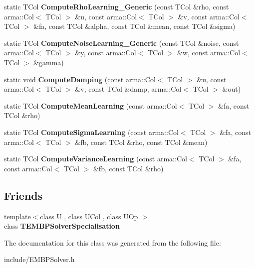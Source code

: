 \begin{DoxyCompactItemize}
\item 
static T\+Col {\bfseries Compute\+Rho\+Learning\+\_\+\+Generic} (const T\+Col \&rho, const arma\+::\+Col$<$ T\+Col $>$ \&u, const arma\+::\+Col$<$ T\+Col $>$ \&v, const arma\+::\+Col$<$ T\+Col $>$ \&fa, const T\+Col \&alpha, const T\+Col \&mean, const T\+Col \&sigma)\hypertarget{classkl1p_1_1TEMBPSolver_ad9b717cd1af082b4d8f950b48f24b330}{}\label{classkl1p_1_1TEMBPSolver_ad9b717cd1af082b4d8f950b48f24b330}

\item 
static T\+Col {\bfseries Compute\+Noise\+Learning\+\_\+\+Generic} (const T\+Col \&noise, const arma\+::\+Col$<$ T\+Col $>$ \&y, const arma\+::\+Col$<$ T\+Col $>$ \&w, const arma\+::\+Col$<$ T\+Col $>$ \&gamma)\hypertarget{classkl1p_1_1TEMBPSolver_a03cb2c068df45df3cd69e5b0dcb74c20}{}\label{classkl1p_1_1TEMBPSolver_a03cb2c068df45df3cd69e5b0dcb74c20}

\item 
static void {\bfseries Compute\+Damping} (const arma\+::\+Col$<$ T\+Col $>$ \&u, const arma\+::\+Col$<$ T\+Col $>$ \&v, const T\+Col \&damp, arma\+::\+Col$<$ T\+Col $>$ \&out)\hypertarget{classkl1p_1_1TEMBPSolver_ab87a0fbcbb23bde5ffcc14dc0dec1de6}{}\label{classkl1p_1_1TEMBPSolver_ab87a0fbcbb23bde5ffcc14dc0dec1de6}

\item 
static T\+Col {\bfseries Compute\+Mean\+Learning} (const arma\+::\+Col$<$ T\+Col $>$ \&fa, const T\+Col \&rho)\hypertarget{classkl1p_1_1TEMBPSolver_ae05e150ae80c6c53a5d2564437a6d117}{}\label{classkl1p_1_1TEMBPSolver_ae05e150ae80c6c53a5d2564437a6d117}

\item 
static T\+Col {\bfseries Compute\+Sigma\+Learning} (const arma\+::\+Col$<$ T\+Col $>$ \&fa, const arma\+::\+Col$<$ T\+Col $>$ \&fb, const T\+Col \&rho, const T\+Col \&mean)\hypertarget{classkl1p_1_1TEMBPSolver_a80e62edf7a1269d87b72287f1bcf4e7f}{}\label{classkl1p_1_1TEMBPSolver_a80e62edf7a1269d87b72287f1bcf4e7f}

\item 
static T\+Col {\bfseries Compute\+Variance\+Learning} (const arma\+::\+Col$<$ T\+Col $>$ \&fa, const arma\+::\+Col$<$ T\+Col $>$ \&fb, const T\+Col \&rho)\hypertarget{classkl1p_1_1TEMBPSolver_ad8b0cb460720ab7a7e3de14f54ad7d10}{}\label{classkl1p_1_1TEMBPSolver_ad8b0cb460720ab7a7e3de14f54ad7d10}

\end{DoxyCompactItemize}
\subsection*{Friends}
\begin{DoxyCompactItemize}
\item 
{\footnotesize template$<$class U , class U\+Col , class U\+Op $>$ }\\class {\bfseries T\+E\+M\+B\+P\+Solver\+Specialisation}\hypertarget{classkl1p_1_1TEMBPSolver_a2158ad5bc07c5e0e2adefae8c0b21ffb}{}\label{classkl1p_1_1TEMBPSolver_a2158ad5bc07c5e0e2adefae8c0b21ffb}

\end{DoxyCompactItemize}


The documentation for this class was generated from the following file\+:\begin{DoxyCompactItemize}
\item 
include/E\+M\+B\+P\+Solver.\+h\end{DoxyCompactItemize}
